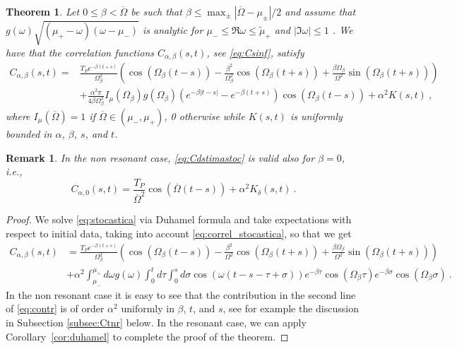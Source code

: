 \documentclass[11pt]{article}
\numberwithin{equation}{section}
\def\red{\textcolor{red}}
\def\red{}
\newtheorem{theo}{Theorem}
\newtheorem{rmk}[theorem]{Remark}
\numberwithin{theorem}{section}
\newcommand{\dam}{\beta}
\def\tilde#1{\widetilde{#1}}
\begin{document}
\begin{theo}\label{th:stoc} 
Let $0\leq\dam<\overline\Omega$ be such that
$\dam\le\max_\pm | \overline\Omega-\mu_\pm|/2$ and assume that \red{$g(\omega)\sqrt{(\mu_+-\omega)(\omega-\mu_-)}$} is analytic for $\mu_-\le \Re \omega\le \tilde \mu_+$ and $|\Im
\omega|\le 1$ . We have that the correlation functions 
$C_{\alpha,\dam}(s,t)$, see \eqref{eq:Csinf}, satisfy
%
\begin{equation}\label{eq:Cdstimastoc}
\begin{split}
C_{\alpha,\dam}(s,t)=&\frac{T_Pe^{-\dam(t+s)}}{\Omega_\dam^2}\left(
\cos(\Omega_\dam(t-s))-\frac{\beta^2}{\Omega_\dam^2}\cos(\Omega_\dam (t+s)) 
+\frac{\beta\Omega_\dam}{\Omega^2}\sin(\Omega_\dam(t+s))\right) \\ &+\frac{\alpha^2\pi}{4\dam\Omega_\dam^2}
I_\mu(\Omega_\dam)g(\Omega_\dam)\left(e^{-\dam|t-s|}-e^{-\dam(t+s)}\right)\cos\left(\Omega_\dam(t-s)\right)
+\alpha^2K(s,t)\ ,
\end{split}
\end{equation}
where $I_\mu(\overline\Omega)=1$  if $\overline\Omega\in(\mu_-,\mu_+)$, 0 otherwise while $K(s,t)$ is uniformly bounded in $\alpha$, 
$\dam$, $s$, and $t$.
\end{theo}

\begin{rmk}\label{rmk:stoc_senza_smorzamento}
\emph{In the non resonant case, \eqref{eq:Cdstimastoc}  is valid also for $\beta=0$, i.e.,
\[
 C_{\alpha,0}(s,t)=\frac{T_P}{\overline\Omega^2}\cos(\overline\Omega(t-s)) + \alpha^2K_\delta(s,t)\ .
\]}
\end{rmk}

\begin{proof}
  \red{We solve \eqref{eq:stocastica} via Duhamel formula and take expectations with respect to initial data, taking into account \eqref{eq:correl_stocastica}, so that we get}
\begin{equation}\label{eq:contr}
  \begin{split}
 C_{\alpha,\dam}(s,t)&=\frac{T_Pe^{-\dam(t+s)}}{\Omega_\dam^2}\left(
 \cos(\Omega_\dam(t-s))-\frac{\beta^2}{\Omega^2}\cos(\Omega_\dam
 (t+s))  +\frac{\beta\Omega_\dam}{\Omega^2}\sin(\Omega_\dam(t+s))\right) \\
&+ \alpha^2\int_{\mu_-}^{\mu_+}d\omega g(\omega)\int_0^td\tau\int_0^sd\sigma 
 \cos(\omega(t-s-\tau+\sigma))e^{-\dam\tau}\cos(\Omega_\dam \tau) e^{-\dam\sigma}\cos(\Omega_\dam
 \sigma)\ .
  \end{split}
\end{equation}
In the non resonant case it is easy to see that the contribution in the second line of \eqref{eq:contr} is of order 
$\alpha^2$ uniformly in $\dam$, $t$, and $s$, see for example the discussion in Subsection \ref{subsec:Ctnr} below. In 
the resonant case, we can apply Corollary~\ref{cor:duhamel} to complete the proof of the theorem.
\end{proof}
\end{document}
